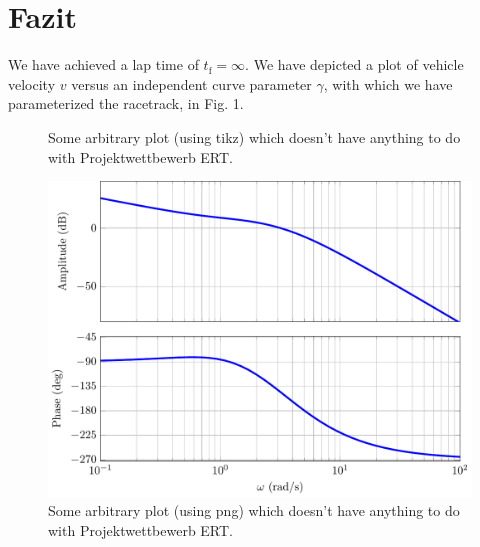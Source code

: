 \documentclass[pdf]{ifacconf}
\begin{document}
\section{Fazit}
We have achieved a lap time of $t_{\text{f}}=\infty$. We have depicted a plot of vehicle velocity $v$ versus an independent curve parameter $\gamma$, with which we have parameterized the racetrack, in Fig. 1. 

\begin{figure}[h] %
\begin{center}

\caption{Some arbitrary plot (using tikz) which doesn't have anything to do with Projektwettbewerb ERT.}
\label{fig1}
\end{center}
\end{figure}

\begin{figure}[h] %
\begin{center}
\includegraphics[width=.8\columnwidth]{bode} %
\caption{Some arbitrary plot (using png) which doesn't have anything to do with Projektwettbewerb ERT.}
\label{fig1}
\end{center}
\end{figure}





%
%

\end{document}
